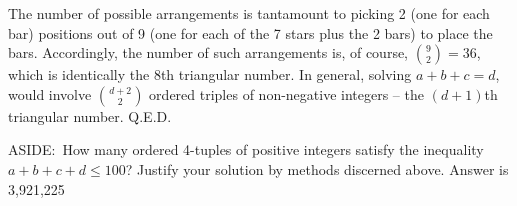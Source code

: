 The number of possible arrangements is tantamount to picking 2 (one for each bar) positions out of 9 (one for each of the 7 stars plus the 2 bars) to place the bars. Accordingly, the number of such arrangements is, of course, \(\binom{9}{2} = 36\), which is identically the 8th triangular number. In general, solving \(a + b + c = d\), would involve \(\binom{d+2}{2}\) ordered triples of non-negative integers – the \((d + 1)\)th triangular number. Q.E.D.

ASIDE:\ How many ordered 4-tuples of positive integers satisfy the inequality \(a + b + c + d \leq 100\)? Justify your solution by methods discerned above. {\scriptsize Answer is 3,921,225}